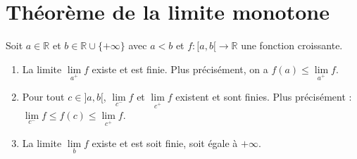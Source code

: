 \documentclass[../main.tex]{subfiles}
\begin{document}
\section{Théorème de la limite monotone}
\begin{tcolorbox}[title=Théorème 15.39, title filled=false, colframe=orange, colback=orange!10!white]
    Soit $a \in \mathbb{R}$ et $b\in \mathbb{R} \cup \{+\infty\}$ avec $a < b$ et $f:[a, b[ \to \mathbb{R}$ une fonction croissante.
    \begin{enumerate}
        \item La limite $\lim\limits_{a^+} f$ existe et est finie. Plus précisément, on a $f(a) \leq \lim\limits_{a^+} f$. 
        \item Pour tout $c \in ]a, b[$, $\lim\limits_{c^-} f$ et $\lim\limits_{c^+} f$ existent et sont finies. Plus précisément : $\lim\limits_{c^-} f \leq f(c) \leq \lim\limits_{c^+} f$. 
        \item La limite $\lim\limits_{b} f$ existe et est soit finie, soit égale à $+\infty$. 
    \end{enumerate}
\end{tcolorbox}
\end{document}
